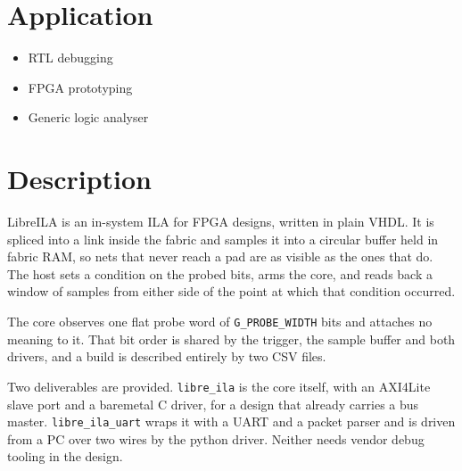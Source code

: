 \documentclass[twocolumn]{article}
\begin{document}
\section{Application}
\begin{itemize}
    \item RTL debugging
    \item FPGA prototyping
    \item Generic logic analyser
\end{itemize}

\section{Description}
LibreILA is an in-system \acf{ILA} for \acs{FPGA} designs, written in plain VHDL. It is spliced into a link inside the fabric and samples it into a circular buffer held in fabric RAM, so nets that never reach a pad are as visible as the ones that do. The host sets a condition on the probed bits, arms the core, and reads back a window of samples from either side of the point at which that condition occurred.

The core observes one flat probe word of \texttt{G\_PROBE\_WIDTH} bits and attaches no meaning to it. That bit order is shared by the trigger, the sample buffer and both drivers, and a build is described entirely by two CSV files.

Two deliverables are provided. \texttt{libre\_ila} is the core itself, with an AXI4Lite slave port and a baremetal C driver, for a design that already carries a bus master. \texttt{libre\_ila\_uart} wraps it with a \acs{UART} and a packet parser and is driven from a PC over two wires by the python driver. Neither needs vendor debug tooling in the design.
\end{document}
